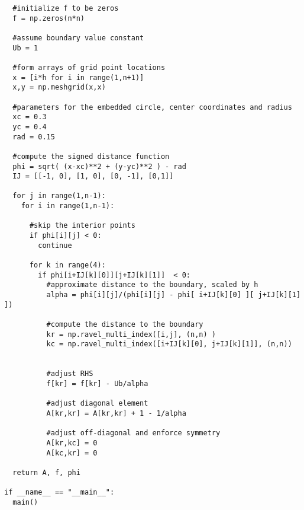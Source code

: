 \documentclass[12pt]{article}
\begin{document}
\begin{verbatim}
  #initialize f to be zeros
  f = np.zeros(n*n)

  #assume boundary value constant
  Ub = 1

  #form arrays of grid point locations
  x = [i*h for i in range(1,n+1)]
  x,y = np.meshgrid(x,x)

  #parameters for the embedded circle, center coordinates and radius
  xc = 0.3
  yc = 0.4
  rad = 0.15

  #compute the signed distance function
  phi = sqrt( (x-xc)**2 + (y-yc)**2 ) - rad
  IJ = [[-1, 0], [1, 0], [0, -1], [0,1]]

  for j in range(1,n-1):
    for i in range(1,n-1):

      #skip the interior points
      if phi[i][j] < 0:
        continue

      for k in range(4):
        if phi[i+IJ[k][0]][j+IJ[k][1]]  < 0:
          #approximate distance to the boundary, scaled by h
          alpha = phi[i][j]/(phi[i][j] - phi[ i+IJ[k][0] ][ j+IJ[k][1] ])

          #compute the distance to the boundary
          kr = np.ravel_multi_index([i,j], (n,n) )
          kc = np.ravel_multi_index([i+IJ[k][0], j+IJ[k][1]], (n,n))


          #adjust RHS
          f[kr] = f[kr] - Ub/alpha

          #adjust diagonal element
          A[kr,kr] = A[kr,kr] + 1 - 1/alpha

          #adjust off-diagonal and enforce symmetry
          A[kr,kc] = 0
          A[kc,kr] = 0

  return A, f, phi

if __name__ == "__main__":
  main()  
\end{verbatim}
\end{document}
